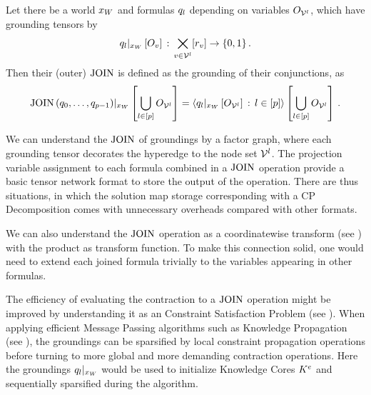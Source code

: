 \begin{definition}
    Let there be a world $x_{W}$ and formulas $q_{l}$ depending on variables $O_{\mathcal{V}^{l}}$, which have grounding tensors by
    \begin{align*}
        {q_{l}}|_{x_{W}} \left[O_{v}\right] \, : \,  \bigtimes_{v\in\mathcal{V}^{l}}[r_{v}] \rightarrow \{0,1\} \, .
    \end{align*}
    Then their (outer) $\mathrm{JOIN}$ is defined as the grounding of their conjunctions, as
    \begin{align*}
        {\mathrm{JOIN}\left(q_{0},\ldots,q_{p-1}\right)}|_{x_{W}} \left[\bigcup_{l\in[p]}O_{\mathcal{V}^{l}}\right]
        = \left\langle {q_{l}}|_{x_{W}} \left[O_{\mathcal{V}^{l}}\right]\,:\,l\in[p]\right\rangle \left[ \bigcup_{l\in[p]}O_{\mathcal{V}^{l}} \right] \, .
    \end{align*}
\end{definition}

We can understand the $\mathrm{JOIN}$ of groundings by a factor graph, where each grounding tensor decorates the hyperedge to the node set $\mathcal{V}^{l}$.
The projection variable assignment to each formula combined in a $\mathrm{JOIN}$ operation provide a basic tensor network format to store the output of the operation.
There are thus situations, in which the solution map storage corresponding with a CP Decomposition comes with unnecessary overheads compared with other formats.

We can also understand the $\mathrm{JOIN}$ operation as a coordinatewise transform (see ) with the product as transform function.
To make this connection solid, one would need to extend each joined formula trivially to the variables appearing in other formulas.

The efficiency of evaluating the contraction to a $\mathrm{JOIN}$ operation might be improved by understanding it as an Constraint Satisfaction Problem (see ).
When applying efficient Message Passing algorithms such as Knowledge Propagation (see ), the groundings can be sparsified by local constraint propagation operations before turning to more global and more demanding contraction operations.
Here the groundings ${q_{l}}|_{x_{W}}$ would be used to initialize Knowledge Cores $K^{e}$ and sequentially sparsified during the algorithm.

